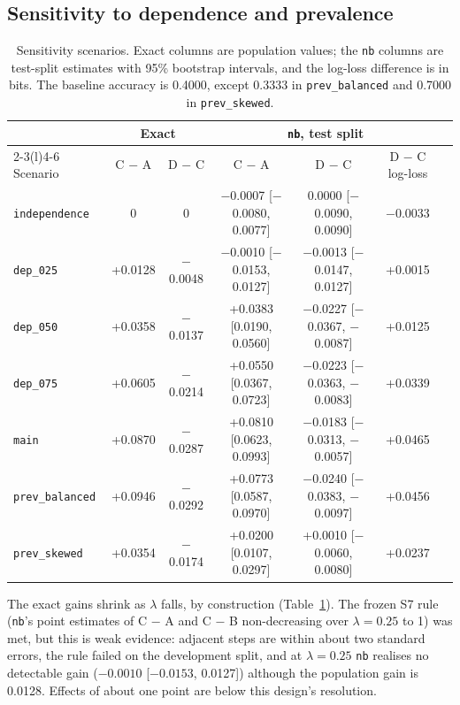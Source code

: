 \documentclass[11pt]{article}
\newcommand{\code}[1]{\texttt{#1}}
\begin{document}
\subsection{Sensitivity to dependence and prevalence}
\label{sec:sensitivity}

\begin{table}[htbp]
\centering\footnotesize
\caption{Sensitivity scenarios. Exact columns are population values; the \code{nb} columns are test-split estimates with 95\% bootstrap intervals, and the log-loss difference is in bits. The baseline accuracy is 0.4000, except 0.3333 in \code{prev\_balanced} and 0.7000 in \code{prev\_skewed}.}
\label{tab:sensitivity}
\setlength{\tabcolsep}{3.5pt}
\begin{tabular}{@{}lcccccc@{}}
\toprule
& \multicolumn{2}{c}{Exact} & \multicolumn{3}{c}{\code{nb}, test split} \\
\cmidrule(lr){2-3}\cmidrule(l){4-6}
Scenario & C $-$ A & D $-$ C & C $-$ A & D $-$ C & D $-$ C log-loss \\
\midrule
\code{independence} & 0 & 0 & $-$0.0007 [$-$0.0080, 0.0077] & 0.0000 [$-$0.0090, 0.0090] & $-$0.0033 \\
\code{dep\_025} & +0.0128 & $-$0.0048 & $-$0.0010 [$-$0.0153, 0.0127] & $-$0.0013 [$-$0.0147, 0.0127] & +0.0015 \\
\code{dep\_050} & +0.0358 & $-$0.0137 & +0.0383 [0.0190, 0.0560] & $-$0.0227 [$-$0.0367, $-$0.0087] & +0.0125 \\
\code{dep\_075} & +0.0605 & $-$0.0214 & +0.0550 [0.0367, 0.0723] & $-$0.0223 [$-$0.0363, $-$0.0083] & +0.0339 \\
\code{main} & +0.0870 & $-$0.0287 & +0.0810 [0.0623, 0.0993] & $-$0.0183 [$-$0.0313, $-$0.0057] & +0.0465 \\
\code{prev\_balanced} & +0.0946 & $-$0.0292 & +0.0773 [0.0587, 0.0970] & $-$0.0240 [$-$0.0383, $-$0.0097] & +0.0456 \\
\code{prev\_skewed} & +0.0354 & $-$0.0174 & +0.0200 [0.0107, 0.0297] & +0.0010 [$-$0.0060, 0.0080] & +0.0237 \\
\bottomrule
\end{tabular}
\end{table}

The exact gains shrink as $\lambda$ falls, by construction (Table~\ref{tab:sensitivity}). The frozen S7 rule (\code{nb}'s point estimates of C $-$ A and C $-$ B non-decreasing over $\lambda = 0.25$ to 1) was met, but this is weak evidence: adjacent steps are within about two standard errors, the rule failed on the development split, and at $\lambda = 0.25$ \code{nb} realises no detectable gain ($-0.0010$ [$-0.0153$, 0.0127]) although the population gain is 0.0128. Effects of about one point are below this design's resolution.
\end{document}
